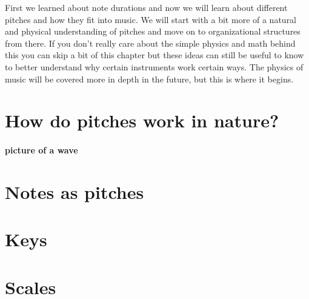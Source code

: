 \documentclass[../OpenAppliedMusicTheory.tex]{subfiles}
\begin{document}
    
    First we learned about note durations and now we will learn about different pitches and how they fit into music. We will start with a bit more of a natural and physical understanding of pitches and move on to organizational structures from there. If you don't really care about the simple physics and math behind this you can skip a bit of this chapter but these ideas can still be useful to know to better understand why certain instruments work certain ways. The physics of music will be covered more in depth in the future, but this is where it begins. %

    \section{How do pitches work in nature?}\label{ch3:pitches-in-nature}
    \paragraph{picture of a wave}

    \section{Notes as pitches}\label{ch3:note-pitches}

    \section{Keys}\label{ch3:keys}

    \section{Scales}\label{ch3:scales}
\end{document}
